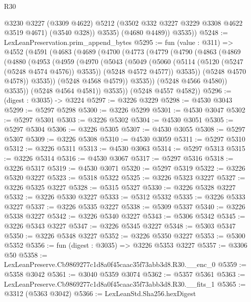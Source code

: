 \begin{lexlean}{R30}
\begin{coremodule}
              @3230
              @3227
              (@3309 @4622)
              @5212
              (@3502 @332 @3227 @3229 @3308 @4622 @3519 @4671)
              (@3540 @328))
            @3535)
          (@4680 @4489))
        @3535))
@5248 := LexLeanPreservation.prim_append_bytes
@5295 := fun (value : @311) =>
  @4552
    (@4591
      (@4683
        (@4689
          (@4700
            (@4773
              (@4779
                (@4790
                  (@4863
                    (@4869
                      (@4880
                        (@4953
                          (@4959
                            (@4970
                              (@5043
                                (@5049
                                  (@5060
                                    (@5114 (@5120 (@5247 (@5248 @4574 @4576)) @3535))
                                    (@5248 @4572 @4577))
                                  @3535))
                              (@5248 @4570 @4578))
                            @3535))
                        (@5248 @4568 @4579))
                      @3535))
                  (@5248 @4566 @4580))
                @3535))
            (@5248 @4564 @4581))
          @3535))
      (@5248 @4557 @4582))
@5296 := (digest : @3035) -> @3224
@5297 := @3226 @3229
@5298 := @4530 @3043
@5299 := @5297 @5298
@5300 := @3226 @5299
@5301 := @4530 @3047
@5302 := @5297 @5301
@5303 := @3226 @5302
@5304 := @4530 @3051
@5305 := @5297 @5304
@5306 := @3226 @5305
@5307 := @4530 @3055
@5308 := @5297 @5307
@5309 := @3226 @5308
@5310 := @4530 @3059
@5311 := @5297 @5310
@5312 := @3226 @5311
@5313 := @4530 @3063
@5314 := @5297 @5313
@5315 := @3226 @5314
@5316 := @4530 @3067
@5317 := @5297 @5316
@5318 := @3226 @5317
@5319 := @4530 @3071
@5320 := @5297 @5319
@5322 := @3226 @5320 @3227
@5323 := @5318 @5322
@5325 := @3226 @5323 @3227
@5327 := @3226 @5325 @3227
@5328 := @5315 @5327
@5330 := @3226 @5328 @3227
@5332 := @3226 @5330 @3227
@5333 := @5312 @5332
@5335 := @3226 @5333 @3227
@5337 := @3226 @5335 @3227
@5338 := @5309 @5337
@5340 := @3226 @5338 @3227
@5342 := @3226 @5340 @3227
@5343 := @5306 @5342
@5345 := @3226 @5343 @3227
@5347 := @3226 @5345 @3227
@5348 := @5303 @5347
@5350 := @3226 @5348 @3227
@5352 := @3226 @5350 @3227
@5353 := @5300 @5352
@5356 := fun (digest : @3035) => @3226 @5353 @3227
@5357 := @3306 @50
@5358 := LexLeanPreserve.Cb9869277c1d8a0f45caac35f73abb3d8.R30.__enc_0
@5359 := @5358 @3042
@5361 := @3040 @5359 @3074
@5362 := @5357 @5361
@5363 := LexLeanPreserve.Cb9869277c1d8a0f45caac35f73abb3d8.R30.__fits_1
@5365 := @3312 (@5363 @3042)
@5366 := LexLeanStd.Sha256.hexDigest

\end{coremodule}
\end{lexlean}
